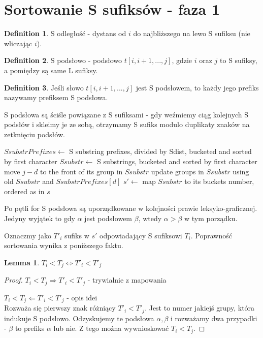 \documentclass[
12pt
]{article}
\newtheorem{lemma}[theorem]{Lemma}
\theoremstyle{definition}
\newtheorem{definition}{Definition}
\theoremstyle{remark}
\begin{document}
\section*{Sortowanie S sufiksów - faza 1}

\begin{definition}
S odległość - dystans od $i$ do najbliższego na lewo S sufiksu (nie wliczając $i$).
\end{definition}

\begin{definition}
S podsłowo - podsłowo $t[i,i+1,...,j]$, gdzie $i$ oraz $j$ to S sufiksy, a pomiędzy są same L sufiksy.
\end{definition}

\begin{definition}
Jeśli słowo $t[i,i+1,...,j]$ jest S podsłowem, to każdy jego prefiks nazywamy prefiksem S podsłowa.
\end{definition}

S podsłowa są ściśle powiązane z S sufiksami - gdy weźmiemy ciąg kolejnych S podsłów i skleimy je ze sobą, otrzymamy S sufiks modulo duplikaty znaków na zetknięciu podsłów.

\begin{algorithmic}
\State $SsubstrPrefixes \gets$ S substring prefixes, divided by Sdist, bucketed and sorted by first character
\State $Ssubstr \gets$ S substrings, bucketed and sorted by first character
\State move $j-d$ to the front of its group in $Ssubstr$
\EndFor
\State update groups in $Ssubstr$ using old $Ssubstr$ and $SsubstrPrefixes[d]$ 
\EndFor
\State $s' \gets$ map $Ssubstr$ to its buckets number, ordered as in $s$
\State \Return {}
\EndProcedure
\end{algorithmic}

Po pętli for S podsłowa są uporządkowane w kolejności prawie leksyko-graficznej. Jedyny wyjątek to gdy $\alpha$ jest podsłowem $\beta$, wtedy $\alpha > \beta$ w tym porządku.

Oznaczmy jako $T'_i$ sufiks w $s'$ odpowiadający S sufiksowi $T_i$. Poprawność sortowania wynika z poniższego faktu.

\begin{lemma}
$T_i < T_j \iff T'_i < T'_j$
\end{lemma}
\begin{proof}
\item[$T_i < T_j \Rightarrow T'_i < T'_j$] - trywialnie z mapowania
\item[$T_i < T_j \Leftarrow T'_i < T'_j$] - opis idei\\
Rozważa się pierwszy znak różniący $T'_i < T'_j$. Jest to numer jakiejś grupy, która indukuje S podsłowo. Odzyskujemy te podsłowa $\alpha,\beta$ i rozważamy dwa przypadki - $\beta$ to prefiks $\alpha$ lub nie. Z tego można wywnioskować $T_i < T_j$.
\end{proof}
\end{document}
